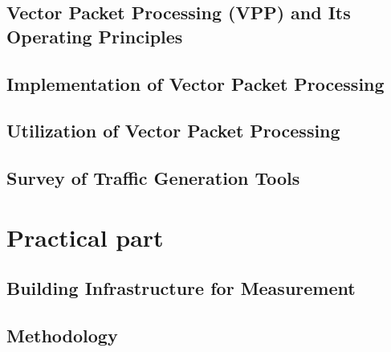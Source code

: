 \section{Vector Packet Processing (VPP) and Its Operating Principles}


\section{Implementation of Vector Packet Processing}


\section{Utilization of Vector Packet Processing}


\section{Survey of Traffic Generation Tools}


\chapter{Practical part}

\section{Building Infrastructure for Measurement}


\section{Methodology}


